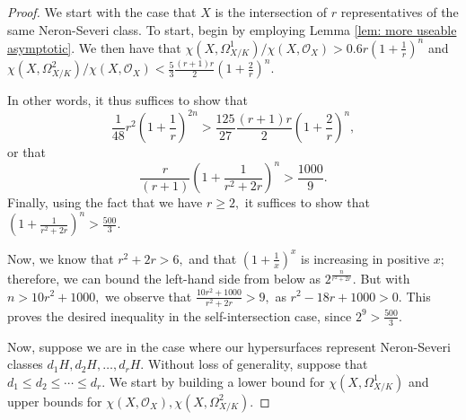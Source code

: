 \documentclass{article}
\theoremstyle{definition}
\theoremstyle{remark}
\begin{document}
\begin{proof}
We start with the case that $X$ is the intersection of $r$ representatives of the same Neron-Severi class. To start, begin by employing Lemma \ref{lem: more useable asymptotic}. We then have that $\chi(X, \Omega^1_{X/K})/\chi(X, \mathcal{O}_X) > 0.6 r \left( 1 + \frac{1}{r}\right)^n$ and $\chi(X, \Omega^2_{X/K})/\chi(X, \mathcal{O}_X) < \frac{5}{3} \frac{(r+1)r}{2} \left(1 + \frac{2}{r} \right)^n.$ 
\par In other words, it thus suffices to show that \[\frac{1}{48} r^2 \left( 1 + \frac{1}{r}\right)^{2n} > \frac{125}{27} \frac{(r+1)r}{2} \left(1 + \frac{2}{r}\right)^n,\] or that \[\frac{r}{(r+1)} \left(1 + \frac{1}{r^2 + 2r}\right)^n > \frac{1000}{9}.\] Finally, using the fact that we have $r \geq 2,$ it suffices to show that $\left(1 + \frac{1}{r^2 + 2r}\right)^n > \frac{500}{3}.$
\par Now, we know that $r^2 + 2r > 6,$ and that $(1+\frac{1}{x})^x$ is increasing in positive $x;$ therefore, we can bound the left-hand side from below as $2^{\frac{n}{r^2 + 2r}}.$ But with $n > 10r^2 + 1000,$ we observe that $\frac{10r^2 + 1000}{r^2 + 2r} > 9,$ as $r^2 - 18r + 1000 > 0.$ This proves the desired inequality in the self-intersection case, since $2^9 > \frac{500}{3}.$
\par Now, suppose we are in the case where our hypersurfaces represent Neron-Severi classes $d_1H, d_2H, \ldots, d_rH.$ Without loss of generality, suppose that $d_1 \leq d_2 \leq \cdots \leq d_r.$ We start by building a lower bound for $\chi(X, \Omega^1_{X/K})$ and upper bounds for $\chi(X, \mathcal{O}_X), \chi(X, \Omega^2_{X/K}).$

\end{proof}
\end{document}
